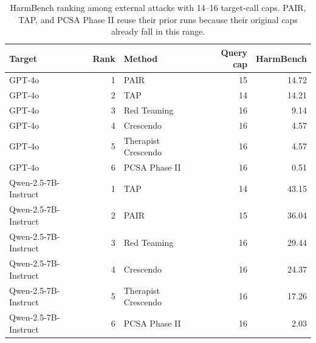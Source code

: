 \begin{table}[t]
\centering
\small
\caption{HarmBench ranking among external attacks with 14--16 target-call caps. PAIR, TAP, and PCSA Phase II reuse their prior runs because their original caps already fall in this range.}
\label{tab:query16-ranking}
\begin{tabular}{lr lrr}
\toprule
Target & Rank & Method & Query cap & HarmBench \\
\midrule
GPT-4o & 1 & PAIR & 15 & 14.72 \\
GPT-4o & 2 & TAP & 14 & 14.21 \\
GPT-4o & 3 & Red Teaming & 16 & 9.14 \\
GPT-4o & 4 & Crescendo & 16 & 4.57 \\
GPT-4o & 5 & Therapist Crescendo & 16 & 4.57 \\
GPT-4o & 6 & PCSA Phase II & 16 & 0.51 \\
Qwen-2.5-7B-Instruct & 1 & TAP & 14 & 43.15 \\
Qwen-2.5-7B-Instruct & 2 & PAIR & 15 & 36.04 \\
Qwen-2.5-7B-Instruct & 3 & Red Teaming & 16 & 29.44 \\
Qwen-2.5-7B-Instruct & 4 & Crescendo & 16 & 24.37 \\
Qwen-2.5-7B-Instruct & 5 & Therapist Crescendo & 16 & 17.26 \\
Qwen-2.5-7B-Instruct & 6 & PCSA Phase II & 16 & 2.03 \\
\bottomrule
\end{tabular}
\end{table}
